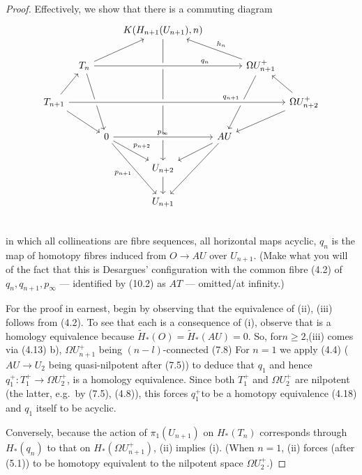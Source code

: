 \begin{proof}
  Effectively, we show that there is a commuting diagram 
\[\begin{tikzcd}[column sep=tiny]
  & & & K(H_{n+1}(U_{n+1}),n)\arrow{dddd} & \\
  &T_n \arrow[rru] \arrow{ddr} \arrow[rrrr,"q_n",near end,crossing over] & & & &\Omega U_{n+1}^+ \arrow[ull,"h_n"'] \arrow{ddl}\\
T_{n+1} \arrow{ru} \arrow{rrd} \arrow[rrrrrr,"q_{n+1}",near end,crossing over]& & & & & & \Omega U_{n+2}^+ \arrow{ul} \arrow{lld} \\
 & & 0 \arrow[rr,"p_{\infty}",crossing over] \arrow[rd,"p_{n+2}"] \arrow[rdd,"p_{n+1}"'] & & AU \arrow{ld} \arrow{ldd}\\
 & & & U_{n+2} \arrow{d} \\
 & & & U_{n+1} \\
\end{tikzcd}\]
in which all collineations are fibre sequences, all horizontal maps acyclic, $q_n$ is the map of homotopy fibres induced from $O \longrightarrow AU $ over $ U_{n+1}$. (Make what you will of the fact that this is Desargues' configuration with the common fibre (4.2) of $q_n, q_{n+1},p_\infty$ --- identified by (10.2) as
$AT$ --- omitted/at infinity.)

For the proof in earnest, begin by observing that the equivalence of (ii), (iii) follows from (4.2). To see that each is a consequence of (i), observe that is a homology equivalence because $\widetilde{H}_*(O) = \widetilde{H}_*(AU) = 0$. So, for$ n \geqslant 2$,(iii) comes via (4.13) b), $\Omega U_{n+1}^+$ being $(n-l)$-connected (7.8) For $n = 1$ we apply (4.4) ($AU\longrightarrow U_2$ being quasi-nilpotent after (7.5)) to deduce that $q_1$ and hence $q_1^+ \colon  T_1^+\longrightarrow \Omega U_2^+$, is a homology equivalence. Since both $T_1^+$ and $\Omega U_2^+$ are nilpotent (the latter, e.g.\  by (7.5), (4.8)), this forces $q_1^+ $to be a homotopy equivalence (4.18) and $q_1$ itself to be acyclic.

Conversely, because the action of $\pi_1(U_{n+1})$ on $H_*(T_n)$ corresponds through $H_*(q_n)$ to that on $H_*(\Omega U_{n+1}^+)$, (ii) implies (i). (When $n = 1$, (ii) forces (after (5.1)) to be homotopy equivalent to the nilpotent space $\Omega U_2^+$.)


\end{proof}
